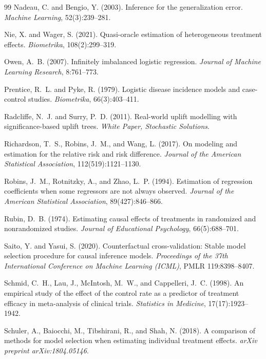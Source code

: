 \documentclass{article}
\begin{document}
\begin{thebibliography}{99}
Nadeau, C. and Bengio, Y. (2003).
Inference for the generalization error.
\emph{Machine Learning}, 52(3):239--281.

Nie, X. and Wager, S. (2021).
Quasi-oracle estimation of heterogeneous treatment effects.
\emph{Biometrika}, 108(2):299--319.

Owen, A.~B. (2007).
Infinitely imbalanced logistic regression.
\emph{Journal of Machine Learning Research}, 8:761--773.

Prentice, R.~L. and Pyke, R. (1979).
Logistic disease incidence models and case-control studies.
\emph{Biometrika}, 66(3):403--411.

Radcliffe, N.~J. and Surry, P.~D. (2011).
Real-world uplift modelling with significance-based uplift trees.
\emph{White Paper, Stochastic Solutions}.

Richardson, T.~S., Robins, J.~M., and Wang, L. (2017).
On modeling and estimation for the relative risk and risk difference.
\emph{Journal of the American Statistical Association}, 112(519):1121--1130.

Robins, J.~M., Rotnitzky, A., and Zhao, L.~P. (1994).
Estimation of regression coefficients when some regressors are not always observed.
\emph{Journal of the American Statistical Association}, 89(427):846--866.

Rubin, D.~B. (1974).
Estimating causal effects of treatments in randomized and nonrandomized studies.
\emph{Journal of Educational Psychology}, 66(5):688--701.

Saito, Y. and Yasui, S. (2020).
Counterfactual cross-validation: Stable model selection procedure for causal inference models.
\emph{Proceedings of the 37th International Conference on Machine Learning (ICML)}, PMLR 119:8398--8407.

Schmid, C.~H., Lau, J., McIntosh, M.~W., and Cappelleri, J.~C. (1998).
An empirical study of the effect of the control rate as a predictor of treatment efficacy in meta-analysis of clinical trials.
\emph{Statistics in Medicine}, 17(17):1923--1942.

Schuler, A., Baiocchi, M., Tibshirani, R., and Shah, N. (2018).
A comparison of methods for model selection when estimating individual treatment effects.
\emph{arXiv preprint arXiv:1804.05146}.


\end{thebibliography}
\end{document}

